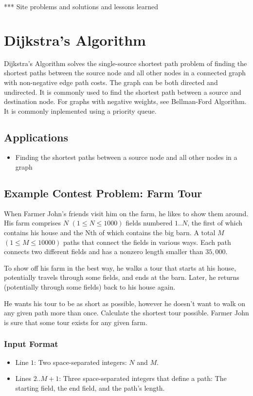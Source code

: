 *** Site problems and solutions and lessons learned 

\section{Dijkstra's Algorithm}
Dijkstra’s Algorithm solves the single-source shortest path problem of finding the shortest paths between the source 
node and all other nodes in a connected graph with non-negative edge path costs.  
The graph can be both directed and undirected.  
It is commonly used to find the shortest path between a source and destination node.  
For graphs with negative weights, see Bellman-Ford Algorithm.
It is commonly inplemented using a priority queue.

\subsection{Applications}

\begin{itemize}
	\item  Finding the shortest paths between a source node and all other nodes in a graph
\end{itemize}

\subsection{Example Contest Problem: Farm Tour\cite{farmtour}}
When Farmer John's friends visit him on the farm, he likes to show them around. 
His farm comprises $N$ $(1 \leq N \leq 1000)$ fields numbered $1..N$, the first of which contains his house and the Nth of which contains the big barn. 
A total $M$ $(1 \leq M \leq 10000)$ paths that connect the fields in various ways. 
Each path connects two different fields and has a nonzero length smaller than $35,000$. 

To show off his farm in the best way, he walks a tour that starts at his house, potentially travels through some fields, and ends at the barn. 
Later, he returns (potentially through some fields) back to his house again. 

He wants his tour to be as short as possible, however he doesn't want to walk on any given path more than once. 
Calculate the shortest tour possible. 
Farmer John is sure that some tour exists for any given farm.

\subsubsection{Input Format}
\begin{itemize}
	\item Line $1$: Two space-separated integers: $N$ and $M$. 
	\item Lines $2..M+1$: Three space-separated integers that define a path: The starting field, the end field, and the path's length. 
\end{itemize}

